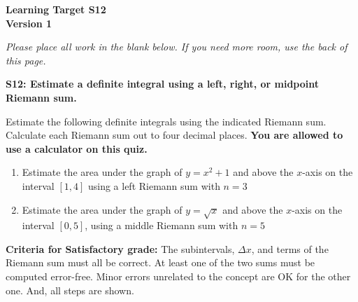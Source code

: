 \documentclass[10pt]{article}
\begin{document}
	\vspace*{0in}

		\begin{center}
			\textbf{Learning Target S12 \\
			Version 1} \\
		\end{center}

\emph{Please place all work in the blank below. If you need more room, use the back of this page.}

\begin{framed}
	\textbf{\textbf{S12:} Estimate a definite integral using a left, right, or midpoint Riemann sum.}
\end{framed}

Estimate the following definite integrals using the indicated Riemann sum. Calculate each Riemann sum out to four decimal places. \textbf{You are allowed to use a calculator on this quiz.}

\begin{enumerate}
    \item Estimate the area under the graph of $y = x^2 + 1$ and above the $x$-axis on the interval $[1,4]$ using a left Riemann sum with $n=3$
    \item Estimate the area under the graph of $y = \sqrt{x}$ and above the $x$-axis on the interval $[0,5]$, using a  middle Riemann sum with $n=5$
\end{enumerate}

\vfill


\begin{small}
    \begin{framed}
        	\textbf{Criteria for Satisfactory grade:} The subintervals, $\Delta x$, and terms of the Riemann sum must all be correct. At least one of the two sums must be computed error-free. Minor errors unrelated to the concept are OK for the other one. And, all steps are shown. 
    \end{framed}

\end{small}
\end{document}
